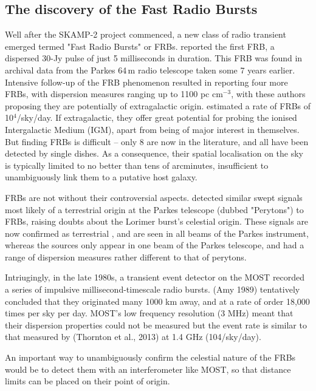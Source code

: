 \subsection{The discovery of the Fast Radio Bursts}

Well after the SKAMP-2 project commenced, a new class of radio transient emerged termed "Fast Radio Bursts" or FRBs. \cite{Lorimer_2007} reported the first FRB, a dispersed 30-Jy pulse of just 5 milliseconds in duration. This FRB was found in archival data from the Parkes 64\,m radio telescope taken some 7 years earlier. Intensive follow-up of the FRB phenomenon resulted in \citep{Thornton_2013} reporting four more FRBs, with dispersion measures ranging up to 1100 pc cm$^{-3}$, with these authors proposing they are potentially of extragalactic origin. \citep{Thornton_2013} estimated a rate of FRBs of 10$^4$/sky/day. If extragalactic, they offer great potential for probing the ionised Intergalactic Medium (IGM), apart from being of major interest in themselves. But finding FRBs is difficult \cite{Keane_2012} -- only 8 are now in the literature, and all have been detected by single dishes. As a consequence, their spatial localisation on the sky is typically limited to no better than tens of arcminutes, insufficient to unambiguously link them to a putative host galaxy. 

FRBs are not without their controversial aspects. \cite{Burke_Spolaor_2011} detected similar swept signals most likely of a terrestrial origin at the Parkes telescope (dubbed "Perytons") to FRBs, raising doubts about the Lorimer burst's celestial origin. These signals are now confirmed as terrestrial \cite{2015arXiv150402165P}, and are seen in all beams of the Parkes instrument, whereas the \cite{Thornton_2013} sources only appear in one beam of the Parkes telescope, and had a range of dispersion measures rather different to that of perytons.

Intriugingly, in the late 1980s, a transient event detector on the MOST recorded a series of impulsive millisecond-timescale radio bursts. (Amy 1989) tentatively concluded that they originated many 1000 km away, and at a rate of order 18,000 times per sky per day. MOST’s low frequency resolution (3 MHz) meant that their dispersion properties could not be measured but the event rate is similar to that measured by (Thornton et al., 2013) at 1.4 GHz (104/sky/day).

An important way to unambiguously confirm the celestial nature of the FRBs would be to detect them with an interferometer like MOST, so that distance limits can be placed on their point of origin.
    
  